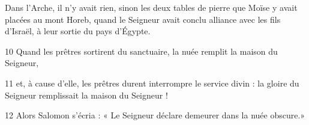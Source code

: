 Dans l’Arche, il n’y avait rien, sinon les deux tables de pierre que Moïse y avait placées au mont Horeb, quand le Seigneur avait conclu alliance avec les fils d’Israël, à leur sortie du pays d’Égypte.

10 Quand les prêtres sortirent du sanctuaire, la nuée remplit la maison du Seigneur,

11 et, à cause d’elle, les prêtres durent interrompre le service divin : la gloire du Seigneur remplissait la maison du Seigneur !

12 Alors Salomon s’écria : « Le Seigneur déclare demeurer dans la nuée obscure.»